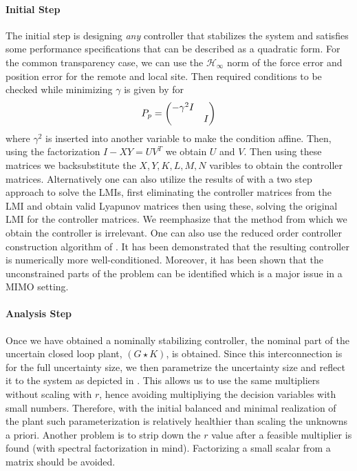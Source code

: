 \paragraph{Initial Step} The initial step is designing \emph{any} controller that stabilizes the system and satisfies some performance
specifications that can be described as a quadratic form. For the common transparency case, we can use the $\mathcal{H}_\infty$ norm
of the force error and position error for the remote and local site. Then required conditions to be checked while minimizing $\gamma$
is given by  for 
\[
P_p = \begin{pmatrix}-\gamma^2 I&\\&I\end{pmatrix}
\]
where $\gamma^2$ is inserted into another variable to make the condition affine. Then, using the factorization $I-XY=UV^T$ we obtain 
$U$ and $V$. Then using these matrices we backsubstitute the $X,Y,K,L,M,N$ varibles to obtain the controller matrices. 
Alternatively one can also utilize the results of \cite{gahapk} with a two step approach to solve the LMIs, first eliminating the 
controller matrices from the LMI and obtain valid Lyapunov matrices then using these, solving the original LMI for the controller
matrices. We reemphasize that the method from which we obtain the controller is irrelevant. One can also use the reduced order
controller construction algorithm of \cite{helmerssontac}. It has been demonstrated that the resulting controller is numerically
more well-conditioned. Moreover, it has been shown that the unconstrained parts of the problem can be identified which is a major
issue in a MIMO setting.

\paragraph{Analysis Step} Once we have obtained a nominally stabilizing controller, the nominal part of the uncertain closed loop 
plant, $(G\star K)$, is obtained. Since this interconnection is for the full uncertainty size, we then parametrize the uncertainty 
size and reflect it to the system as depicted in . This allows us to use the same multipliers without scaling
with $r$, hence avoiding multipliying the decision variables with small numbers. Therefore, with the initial balanced and minimal
realization of the plant such parameterization is relatively healthier than scaling the unknowns a priori. Another problem is to 
strip down the $r$ value after a feasible multiplier is found (with spectral factorization in mind). Factorizing a small scalar
from a matrix should be avoided.

